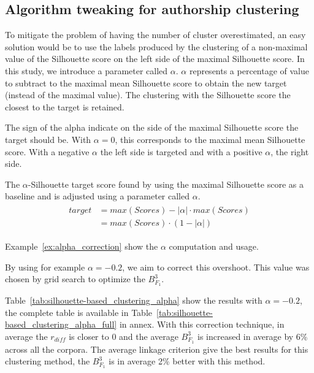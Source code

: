 \subsection{Algorithm tweaking for authorship clustering}

To mitigate the problem of having the number of cluster overestimated, an easy solution would be to use the labels produced by the clustering of a non-maximal value of the Silhouette score on the left side of the maximal Silhouette score.
In this study, we introduce a parameter called $\alpha$.
$\alpha$ represents a percentage of value to subtract to the maximal mean Silhouette score to obtain the new target (instead of the maximal value).
The clustering with the Silhouette score the closest to the target is retained.

The sign of the alpha indicate on the side of the maximal Silhouette score the target should be.
With $\alpha = 0$, this corresponds to the maximal mean Silhouette score.
With a negative $\alpha$ the left side is targeted and with a positive $\alpha$, the right side.

\begin{definition}
  The $\alpha$-Silhouette target score found by using the maximal Silhouette score as a baseline and is adjusted using a parameter called $\alpha$.
  \begin{gather*}
    \begin{aligned}
    target &= max(Scores) - |\alpha| \cdot max(Scores) \\
           &= max(Scores) \cdot (1 - |\alpha|)
    \end{aligned}
  \end{gather*}
\end{definition}

Example~\ref{ex:alpha_correction} show the $\alpha$ computation and usage.

By using for example $\alpha = -0.2$, we aim to correct this overshoot.
This value was chosen by grid search to optimize the $B^3_{F_1}$.

Table~\ref{tab:silhouette-based_clustering_alpha} show the results with $\alpha = -0.2$, the complete table is available in Table~\ref{tab:silhouette-based_clustering_alpha_full} in annex.
With this correction technique, in average the $r_{diff}$ is closer to 0 and the average $B^3_{F_1}$ is increased in average by 6\% across all the corpora.
The average linkage criterion give the best results for this clustering method, the $B^3_{F_1}$ is in average 2\% better with this method.

